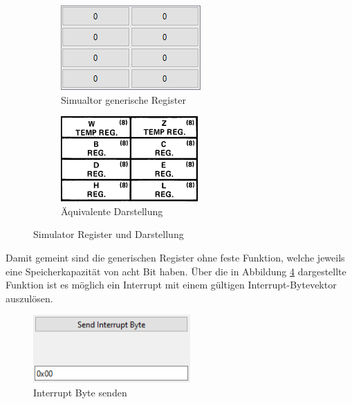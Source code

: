 \documentclass[12pt]{article}
\begin{document}
\begin{figure}[h]
\centering
\begin{subfigure}{.5\textwidth}
  \centering
  \includegraphics[width=.7\linewidth]{bilder/GenericRegister_sim}
  \caption{Simualtor generische Register}
  \label{fig:GenReg_s}
\end{subfigure}%
\begin{subfigure}{.5\textwidth}
  \centering
  \includegraphics[width=.7\linewidth]{bilder/GenericRegister_pic}
  \caption{Äquivalente Darstellung}
  \label{fig:GenReg_p}
\end{subfigure}
\caption{Simulator Register und Darstellung}
\label{fig:GenReg}
\end{figure}

\noindent
Damit gemeint sind die generischen Register ohne feste Funktion, welche jeweils eine Speicherkapazität von acht Bit haben. Über die in Abbildung \ref{fig:Interrupt} dargestellte Funktion ist es möglich ein Interrupt mit einem gültigen Interrupt-Bytevektor auszulösen.\vspace{10pt}

\begin{figure}[h]
\centering
\includegraphics[width=6cm]{bilder/Interrupt}
\caption{Interrupt Byte senden}
\label{fig:Interrupt}
\end{figure}
\end{document}
